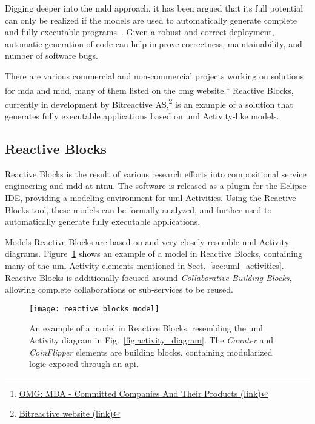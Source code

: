 \noindent
Digging deeper into the \gls{mdd} approach, it has been argued that its full potential can only be realized if the models are used to automatically generate complete and fully executable programs~\cite{selic:model_driven_development}. Given a robust and correct deployment, automatic generation of code can help improve correctness, maintainability, and number of software bugs.

\noindent
There are various commercial and non-commercial projects working on solutions for \gls{mda} and \gls{mdd}, many of them listed on the \gls{omg} website.\footnote{\href{http://www.omg.org/mda/committed-products.htm}{OMG: MDA - Committed Companies And Their Products (link)}} Reactive Blocks, currently in development by Bitreactive AS,\footnote{\href{http://www.bitreactive.com/}{Bitreactive website (link)}} is an example of a solution that generates fully executable applications based on \gls{uml} Activity-like models.

\subsection{Reactive Blocks}
\label{sec:reactive_blocks}
Reactive Blocks is the result of various research efforts into compositional service engineering and \gls{mdd} at \gls{ntnu}\cite{kraemer:arctis_ramses}. The software is released as a plugin for the Eclipse IDE, providing a modeling environment for \gls{uml} Activities. Using the Reactive Blocks tool, these models can be formally analyzed, and further used to automatically generate fully executable applications.

\noindent
Models Reactive Blocks are based on and very closely resemble \gls{uml} Activity diagrams. Figure~\ref{fig:reactive_blocks_model} shows an example of a model in Reactive Blocks, containing many of the \gls{uml} Activity elements mentioned in Sect.~\ref{sec:uml_activities}. Reactive Blocks is additionally focused around \emph{Collaborative Building Blocks}, allowing complete collaborations or sub-services to be reused.

\begin{figure}[htp]
	\centering
	\texttt{[image: reactive\_blocks\_model]}
	\caption[Reactive Blocks model example]{An example of a model in Reactive Blocks, resembling the \gls{uml} Activity diagram in Fig.~\ref{fig:activity_diagram}. The \emph{Counter} and \emph{CoinFlipper} elements are building blocks, containing modularized logic exposed through an \gls{api}.}
	\label{fig:reactive_blocks_model}
\end{figure}

